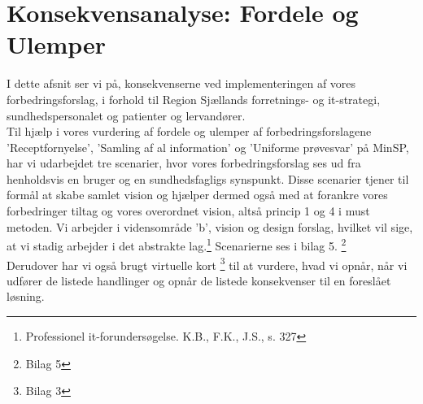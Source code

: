 %
%
%
%
%
%
%
%
%
%
%
%
%
%
%
%
%
%
%
%
%
%
%
%
%
%
%
%
%
%
%
\section{Konsekvensanalyse: Fordele og Ulemper}
I dette afsnit ser vi på, konsekvenserne ved implementeringen af vores forbedringsforslag, i forhold til Region Sjællands forretnings- og it-strategi, sundhedspersonalet og patienter og lervandører.\\
Til hjælp i vores vurdering af fordele og ulemper af forbedringsforslagene 'Receptfornyelse', 'Samling af al information' og 'Uniforme prøvesvar' på MinSP, har vi udarbejdet tre scenarier, hvor vores forbedringsforslag ses ud fra henholdsvis en bruger og en sundhedsfagligs synspunkt. Disse scenarier tjener til formål at skabe samlet vision og hjælper dermed også med at forankre vores forbedringer tiltag og vores overordnet vision, altså princip 1 og 4 i must metoden. Vi arbejder i vidensområde 'b', vision og design forslag, hvilket vil sige, at vi stadig arbejder i det abstrakte lag.\footnote{Professionel it-forundersøgelse. K.B., F.K., J.S., s. 327} Scenarierne ses i bilag 5. \footnote{Bilag 5} \\
Derudover har vi også brugt virtuelle kort \footnote{Bilag 3} til at vurdere, hvad vi opnår, når vi udfører de listede handlinger og opnår de listede konsekvenser til en foreslået løsning.
